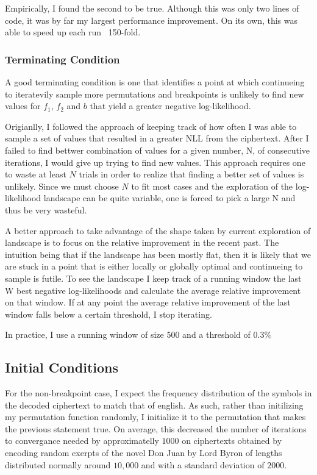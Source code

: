 \documentclass{siamart190516}
\begin{document}
Empirically, I found the second to be true. Although this was only two lines of code, it was by far my largest performance improvement. On its own, this was able to speed up each run ~150-fold.

\subsubsection{Terminating Condition}
A good terminating condition is one that identifies a point at which continueing to iteratevily sample more permutations and breakpoints is unlikely to find new values for $f_1$, $f_2$ and $b$ that yield a greater negative log-likelihood.

Origianlly, I followed the approach of keeping track of how often I was able to sample a set of values that resulted in a greater NLL from the ciphertext. After I failed to find bettwer combination of values for a given number, N, of consecutive iterations, I would give up trying to find new values. This approach requires one to waste at least $N$ trials in order to realize that finding a better set of values is unlikely. Since we must choose $N$ to fit most cases and the exploration of the log-likelihood landscape can be quite variable, one is forced to pick a large N and thus be very wasteful.

A better approach to take advantage of the shape taken by current exploration of landscape is to focus on the relative improvement in the recent past. The intuition being that if the landscape has been mostly flat, then it is likely that we are stuck in a point that is either locally or globally optimal and continueing to sample is futile. To see the landscape I keep track of a running window the last W best negative log-likelihoods and calculate the average relative improvement on that window. If at any point the average relative improvement of the last window falls below a certain threshold, I stop iterating.

In practice, I use a running window of size 500 and a threshold of $0.3\%$

\subsection{Initial Conditions}
For the non-breakpoint case, I expect the frequency distribution of the symbols in the decoded ciphertext to match that of english. As such, rather than initilizing my permutation function randomly, I initialize it to the permutation that makes the previous statement true. On average, this decreased the number of iterations to convergance needed by approximatelly $1000$ on ciphertexts obtained by encoding random exerpts of the novel Don Juan by Lord Byron of lengths distributed normally around
$10,000$ and with a standard deviation of $2000$.
\end{document}
